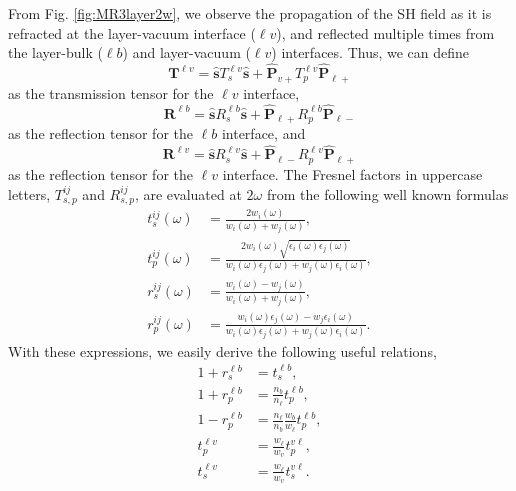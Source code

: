 \documentclass[aps,prb,10pt,showpacs,letterpaper,twocolumn]{revtex4-1}
\begin{document}
From Fig. \ref{fig:MR3layer2w}, we observe the propagation of the SH field as it
is refracted at the layer-vacuum interface ($\ell v$), and reflected multiple
times from the layer-bulk ($\ell b$) and layer-vacuum ($\ell v$) interfaces.
Thus, we can define
\begin{equation}\label{eq:r5}
\mathbf{T}^{\ell v}
= \hat{\mathbf{s}}T_{s}^{\ell v}\hat{\mathbf{s}} 
+ \hat{\mathbf{P}}_{v+}T_{p}^{\ell v} \hat{\mathbf{P}}_{\ell +}
\end{equation}
as the transmission tensor for the $\ell v$ interface,
\begin{equation}\label{eq:r6}
\mathbf{R}^{\ell b}
= \hat{\mathbf{s}}R_{s}^{\ell b}\hat{\mathbf{s}}
+ \hat{\mathbf{P}}_{\ell +}R_{p}^{\ell b} \hat{\mathbf{P}}_{\ell -}
\end{equation} 
as the reflection tensor for the $\ell b$ interface, and
\begin{equation}\label{eq:r6b}
\mathbf{R}^{\ell v}
= \hat{\mathbf{s}}R_{s}^{\ell v}\hat{\mathbf{s}}
+ \hat{\mathbf{P}}_{\ell -}R_{p}^{\ell v} \hat{\mathbf{P}}_{\ell +}
\end{equation} 
as the reflection tensor for the $\ell v$ interface. The Fresnel factors in
uppercase letters, $T^{ij}_{s,p}$ and $R^{ij}_{s,p}$, are evaluated at $2\omega$
from the following well known formulas \cite{jacksonbook}
\begin{equation}\label{eq:e.f1}
\begin{split}
t_{s}^{ij}(\omega) &=
\frac{2w_{i}(\omega)}{w_{i}(\omega) + w_{j}(\omega)},\\
t_{p}^{ij}(\omega) &=
\frac{2w_{i}(\omega)\sqrt{\epsilon_{i}(\omega)\epsilon_j(\omega)}}
     {w_{i}(\omega)\epsilon_{j}(\omega) + w_{j}(\omega)\epsilon_{i}(\omega)},\\
r_{s}^{ij}(\omega) &=
\frac{w_{i}(\omega) - w_{j}(\omega)}
     {w_{i}(\omega) + w_{j}(\omega)},\\
r_{p}^{ij}(\omega) &=
\frac{w_{i}(\omega)\epsilon_{j}(\omega) - w_{j}\epsilon_{i}(\omega)}
     {w_{i}(\omega)\epsilon_{j}(\omega) + w_{j}(\omega)\epsilon_{i}(\omega)}. 
\end{split}
\end{equation}
With these expressions, we easily derive the following useful relations,
\begin{equation}\label{eq:mf}
\begin{split}
1 + r^{\ell b}_{s} &= t^{\ell b}_{s},\\
1 + r^{\ell b}_{p} &= \frac{n_{b}}{n_{\ell}}t^{\ell b}_{p},\\
1 - r^{\ell b}_{p} &= \frac{n_{\ell}}{n_{b}}\frac{w_{b}}{w_{\ell}}
                      t^{\ell b}_{p},\\
t^{\ell v}_{p} &= \frac{w_{\ell}}{w_{v}}t^{v\ell}_{p},\\
t^{\ell v}_{s} &= \frac{w_{\ell}}{w_{v}}t^{v\ell}_{s}.
\end{split}
\end{equation}
\end{document}
